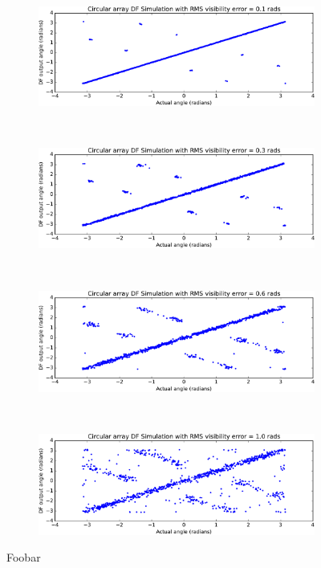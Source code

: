 \begin{figure}
  \begin{subfigure}{\textwidth}
    \centering
    \includegraphics[height=0.23\textheight]{df-simulation-circular-0-1}
  \end{subfigure}\\[1em]
  \begin{subfigure}{\textwidth}
    \centering
    \includegraphics[height=0.23\textheight]{df-simulation-circular-0-3}
  \end{subfigure}\\[1em]
  \begin{subfigure}{\textwidth}
    \centering
    \includegraphics[height=0.23\textheight]{df-simulation-circular-0-6}
  \end{subfigure}\\[1em]
  \begin{subfigure}{\textwidth}
    \centering
    \includegraphics[height=0.23\textheight]{df-simulation-circular-1-0}
  \end{subfigure}
  \caption{Foobar}
\end{figure}
